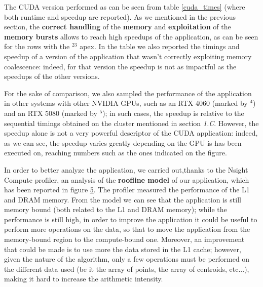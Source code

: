 \documentclass[11pt, journal]{IEEEtran}
\newcommand{\nwl}{

\vspace{11pt}

}
\begin{document}
The CUDA version performed as can be seen from table \ref{cuda_times} (where both runtime and speedup are reported). As we mentioned in the previous section, the \textbf{correct handling} of the \textbf{memory} and \textbf{exploitation} of the \textbf{memory bursts} allows to reach high speedups of the application, as can be seen for the rows with the \textasteriskcentered$^{23}$ apex. In the table we also reported the timings and speedup of a version of the application that wasn't correctly exploiting memory coalescence: indeed, for that version the speedup is not as impactful as the speedups of the other versions.
\nwl
For the sake of comparison, we also sampled the performance of the application in other systems with other NVIDIA GPUs, such as an RTX 4060 (marked by \textasteriskcentered$^4$) and an RTX 5080 (marked by \textasteriskcentered$^5$); in such cases, the speedup is relative to the sequential timings obtained on the cluster mentioned in section \textit{1.C}. However, the speedup alone is not a very powerful descriptor of the CUDA application: indeed, as we can see, the speedup varies greatly depending on the GPU is has been executed on, reaching numbers such as the ones indicated on the figure.
\nwl
In order to better analyze the application, we carried out,thanks to the Nsight Compute profiler, an analysis of the \textbf{roofline model} of our application, which has been reported in figure \href{cuda_roofline}{5}. The profiler measured the performance of the L1 and DRAM memory. From the model we can see that the application is still memory bound (both related to the L1 and DRAM memory); while the performance is still high, in order to improve the application it could be useful to perform more operations on the data, so that to move the application from the memory-bound region to the compute-bound one. Moreover, an improvement that could be made is to use more the data stored in the L1 cache; however, given the nature of the algorithm, only a few operations must be performed on the different data used (be it the array of points, the array of centroids, etc...), making it hard to increase the arithmetic intensity.
\end{document}
